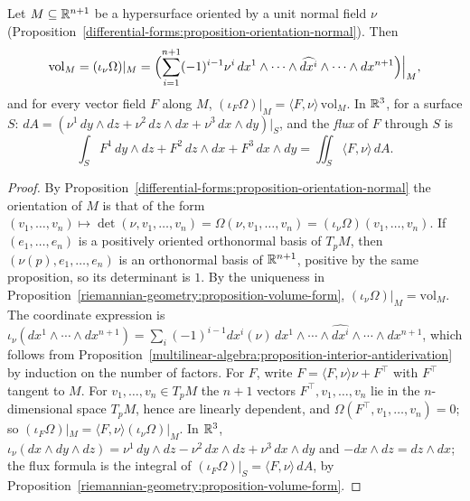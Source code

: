 \begin{proposition}\label{riemannian-geometry:proposition-flux}
Let $M \subseteq \mathbb{R}^{n+1}$ be a hypersurface oriented by a unit normal field $\nu$ (Proposition~\ref{differential-forms:proposition-orientation-normal}). Then
\[
\mathrm{vol}_M = (\iota_\nu\Omega)|_M = \Bigl(\sum_{i=1}^{n+1}(-1)^{i-1}\nu^i\,dx^1 \wedge \cdots \wedge \widehat{dx^i} \wedge \cdots \wedge dx^{n+1}\Bigr)\Big|_M,
\]
and for every vector field $F$ along $M$, $(\iota_F\Omega)|_M = \langle F, \nu\rangle\,\mathrm{vol}_M$. In $\mathbb{R}^3$, for a surface $S$:
$dA = (\nu^1\,dy \wedge dz + \nu^2\,dz \wedge dx + \nu^3\,dx \wedge dy)|_S$, and the \emph{flux} of $F$ through $S$ is
\[
\int_SF^1\,dy \wedge dz + F^2\,dz \wedge dx + F^3\,dx \wedge dy = \iint_S\langle F, \nu\rangle\,dA .
\]
\end{proposition}

\begin{proof}
By Proposition~\ref{differential-forms:proposition-orientation-normal} the orientation of $M$ is that of the form
$(v_1, \ldots, v_n) \mapsto \det(\nu, v_1, \ldots, v_n) = \Omega(\nu, v_1, \ldots, v_n) = (\iota_\nu\Omega)(v_1, \ldots, v_n)$. If $(e_1, \ldots, e_n)$ is a positively
oriented orthonormal basis of $T_pM$, then $(\nu(p), e_1, \ldots, e_n)$ is an orthonormal basis of $\mathbb{R}^{n+1}$, positive by the same proposition, so its determinant is
$1$. By the uniqueness in Proposition~\ref{riemannian-geometry:proposition-volume-form}, $(\iota_\nu\Omega)|_M = \mathrm{vol}_M$. The coordinate expression is
$\iota_\nu(dx^1 \wedge \cdots \wedge dx^{n+1}) = \sum_i(-1)^{i-1}dx^i(\nu)\,dx^1 \wedge \cdots \wedge \widehat{dx^i} \wedge \cdots \wedge dx^{n+1}$, which follows from
Proposition~\ref{multilinear-algebra:proposition-interior-antiderivation} by induction on the number of factors. For $F$, write $F = \langle F, \nu\rangle\nu + F^\top$
with $F^\top$ tangent to $M$. For $v_1, \ldots, v_n \in T_pM$ the $n + 1$ vectors $F^\top, v_1, \ldots, v_n$ lie in the $n$-dimensional space $T_pM$, hence are
linearly dependent, and $\Omega(F^\top, v_1, \ldots, v_n) = 0$; so $(\iota_F\Omega)|_M = \langle F, \nu\rangle(\iota_\nu\Omega)|_M$. In $\mathbb{R}^3$,
$\iota_\nu(dx \wedge dy \wedge dz) = \nu^1\,dy \wedge dz - \nu^2\,dx \wedge dz + \nu^3\,dx \wedge dy$ and $-dx \wedge dz = dz \wedge dx$; the flux formula is the integral
of $(\iota_F\Omega)|_S = \langle F, \nu\rangle\,dA$, by Proposition~\ref{riemannian-geometry:proposition-volume-form}.
\end{proof}

